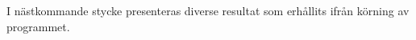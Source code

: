 I nästkommande stycke presenteras diverse resultat som erhållits ifrån körning av programmet.

\begin{comment}
    \item
    Deklaration av temporära variabler har i vissa fall kunnat uteslutas genom sammanskrivning av flera uttryck. 
    Ett specialfall av detta nyttjas i \textsc{DiophAppr} där vi har ersatt uttryck på formen \texttt{temp=x; x=y; y=temp;} med det snabbare \texttt{x,y=y,x;}.

    \item Flera while-loopar har kunnat ersättas med for-loopar,
    som ger att istället för att testa ett argument för varje iteration i loopen,
    behöver argumentet bara testas en gång när loopen påbörjas.
    \item Infogande av iteratorer vid iterering över primtalslistor, vilket också resulterar i bättre nyttjande av cache.

    \item
    I \textsc{DiophAppr} beräknas både heltals- och decimaldelen av $\alpha$. Detta görs i nuläget separat men skulle kunna göras samtidigt.
    Förslagsvis skulle då if-satsen ändras till att testa ifall decimaldelen är noll.
\end{comment}